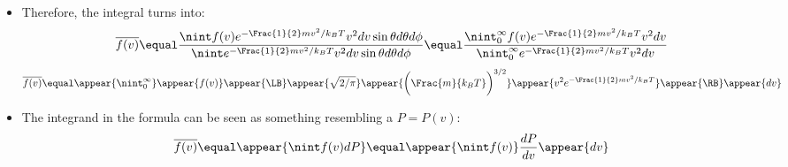 \begin{frame}
\frametitle{\texorpdfstring{\culine[\sectiontitleulinecolor]{\sectiontitle}}{\sectiontitle} }

\begin{itemize}
	\item Therefore, the integral turns into:
	\[
	\overline{f(v)}  \equal  \frac{ \nint f(v) e^{-\Frac{1}{2} m v^{2} / k_{B} T} v^{2} d v \sin \theta d \theta d  \phi }{ \nint e^{-\Frac{1}{2} m v^{2} / k_{B} T} v^{2} d v \sin \theta d \theta d  \phi }
	 \equal  \frac{ \nint_{0}^{\infty} f(v) e^{-\Frac{1}{2} m v^{2} / k_{B} T} v^{2} d v}{ \nint_{0}^{\infty} e^{-\Frac{1}{2} m v^{2} / k_{B} T} v^{2} d v}
	\]
   
\[
\overline{f(v)}  \equal  \appear{\nint_{0}^{\infty}  }\appear{f(v)} \appear{\LB} \appear{\sqrt{2/\pi}} \appear{\bigg( \Frac{m}{k_{B} T}  \bigg)^{3 / 2}} \appear{v^{2} e^{-\Frac{1}{2} m v^{2} / k_{B} T}}\appear{\RB} \appear{d v}
\]

\item The integrand in the formula can be seen as something resembling a  $P=P(v)$:
\[
\overline{f(v)}  \equal  \appear{\nint f(v) d P} \equal  \appear{\nint f(v)} \frac{d P}{d v} \appear{d v}
\]

\end{itemize}


\endofslide 
\end{frame}

